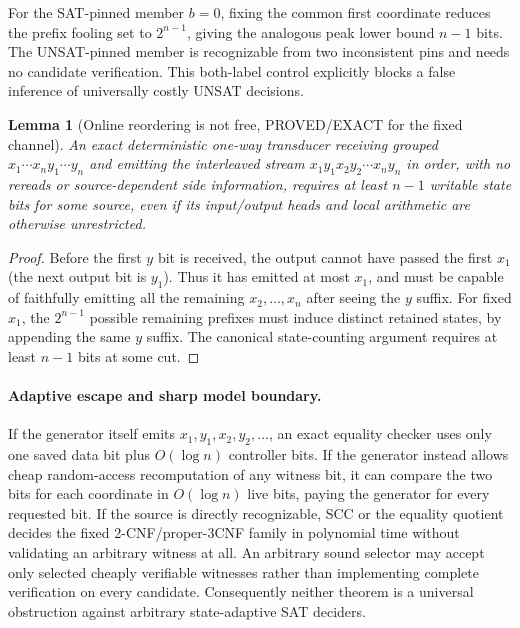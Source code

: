 \documentclass[11pt]{article}
\newtheorem{lemma}[theorem]{Lemma}
\begin{document}
For the SAT-pinned member $b=0$, fixing the common first coordinate reduces the prefix fooling set to $2^{n-1}$, giving the analogous peak lower bound $n-1$ bits. The UNSAT-pinned member is recognizable from two inconsistent pins and needs no candidate verification. This both-label control explicitly blocks a false inference of universally costly UNSAT decisions.

\begin{lemma}[Online reordering is not free, PROVED/EXACT for the fixed channel]
An exact deterministic one-way transducer receiving grouped $x_1\cdots x_n y_1\cdots y_n$ and emitting the interleaved stream $x_1y_1x_2y_2\cdots x_ny_n$ in order, with no rereads or source-dependent side information, requires at least $n-1$ writable state bits for some source, even if its input/output heads and local arithmetic are otherwise unrestricted.
\end{lemma}
\begin{proof}
Before the first $y$ bit is received, the output cannot have passed the first $x_1$ (the next output bit is $y_1$). Thus it has emitted at most $x_1$, and must be capable of faithfully emitting all the remaining $x_2,\ldots,x_n$ after seeing the $y$ suffix. For fixed $x_1$, the $2^{n-1}$ possible remaining prefixes must induce distinct retained states, by appending the same $y$ suffix. The canonical state-counting argument requires at least $n-1$ bits at some cut.
\end{proof}

\paragraph{Adaptive escape and sharp model boundary.}
If the generator itself emits $x_1,y_1,x_2,y_2,\ldots$, an exact equality checker uses only one saved data bit plus $O(\log n)$ controller bits. If the generator instead allows cheap random-access recomputation of any witness bit, it can compare the two bits for each coordinate in $O(\log n)$ live bits, paying the generator for every requested bit. If the source is directly recognizable, SCC or the equality quotient decides the fixed 2-CNF/proper-3CNF family in polynomial time without validating an arbitrary witness at all. An arbitrary sound selector may accept only selected cheaply verifiable witnesses rather than implementing complete verification on every candidate. Consequently neither theorem is a universal obstruction against arbitrary state-adaptive SAT deciders.
\end{document}

